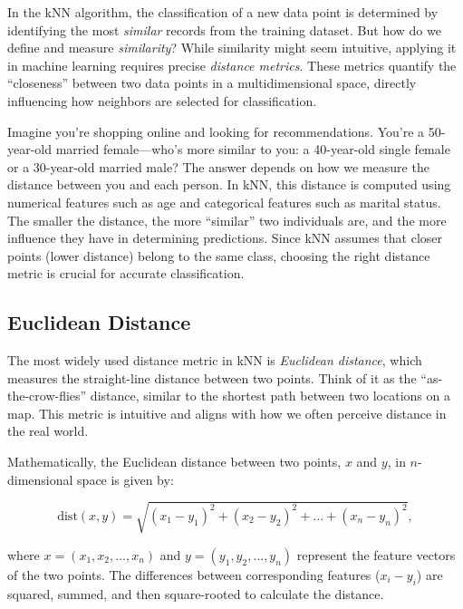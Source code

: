 \documentclass[
]{book}
\theoremstyle{definition}
\theoremstyle{definition}
\theoremstyle{definition}
\theoremstyle{definition}
\theoremstyle{remark}
\begin{document}
In the kNN algorithm, the classification of a new data point is determined by identifying the most \emph{similar} records from the training dataset. But how do we define and measure \emph{similarity}? While similarity might seem intuitive, applying it in machine learning requires precise \emph{distance metrics}. These metrics quantify the ``closeness'' between two data points in a multidimensional space, directly influencing how neighbors are selected for classification.

Imagine you're shopping online and looking for recommendations. You're a 50-year-old married female---who's more similar to you: a 40-year-old single female or a 30-year-old married male? The answer depends on how we measure the distance between you and each person. In kNN, this distance is computed using numerical features such as age and categorical features such as marital status. The smaller the distance, the more ``similar'' two individuals are, and the more influence they have in determining predictions. Since kNN assumes that closer points (lower distance) belong to the same class, choosing the right distance metric is crucial for accurate classification.

\subsection*{Euclidean Distance}\label{euclidean-distance}

The most widely used distance metric in kNN is \emph{Euclidean distance}, which measures the straight-line distance between two points. Think of it as the ``as-the-crow-flies'' distance, similar to the shortest path between two locations on a map. This metric is intuitive and aligns with how we often perceive distance in the real world.

Mathematically, the Euclidean distance between two points, \(x\) and \(y\), in \(n\)-dimensional space is given by:

\[
\text{dist}(x, y) = \sqrt{(x_1 - y_1)^2 + (x_2 - y_2)^2 + \ldots + (x_n - y_n)^2}, 
\]

where \(x = (x_1, x_2, \ldots, x_n)\) and \(y = (y_1, y_2, \ldots, y_n)\) represent the feature vectors of the two points. The differences between corresponding features (\(x_i - y_i\)) are squared, summed, and then square-rooted to calculate the distance.
\end{document}

